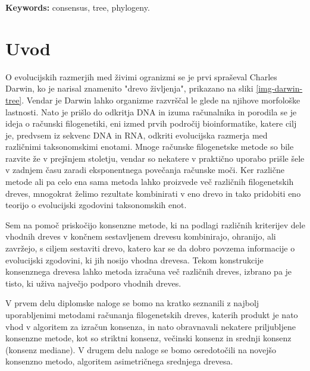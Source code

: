 \documentclass[a4paper, 12pt]{book}
\newcommand{\tkeywordsEn}{consensus, tree, phylogeny}
\newcommand{\clearemptydoublepage}{\newpage{\pagestyle{empty}\cleardoublepage}}
\begin{document}
\noindent\textbf{Keywords:} \tkeywordsEn.
\clearemptydoublepage

\mainmatter
\setcounter{page}{1}
\pagestyle{fancy}

\chapter{Uvod}
O evolucijskih razmerjih med živimi ogranizmi se je prvi spraševal Charles Darwin,
ko je narisal znamenito "drevo življenja", prikazano na sliki \ref{img-darwin-tree}.
Vendar je Darwin lahko organizme razvrščal le glede na njihove morfološke lastnosti.
Nato je prišlo do odkritja DNA in izuma računalnika in porodila se je ideja o računski
filogenetiki, eni izmed prvih področij bioinformatike, katere cilj je, predvsem iz 
sekvenc DNA in RNA, odkriti evolucijska razmerja med različnimi taksonomskimi enotami.
Mnoge računske filogenetske metode so bile razvite že v prejšnjem stoletju, vendar so
nekatere v praktično uporabo prišle šele v zadnjem času zaradi eksponentnega povečanja
računske moči. Ker različne metode ali pa celo ena sama metoda lahko proizvede več 
različnih filogenetskih dreves, mnogokrat želimo rezultate kombinirati v eno drevo in 
tako pridobiti eno teorijo o evolucijski zgodovini taksonomskih enot. 

Sem na pomoč priskočijo konsenzne metode, ki na podlagi različnih  kriterijev dele 
vhodnih dreves v končnem sestavljenem drevesu kombinirajo, ohranijo, ali zavržejo, 
s ciljem sestaviti drevo, katero kar se da dobro povzema informacije o evolucijski 
zgodovini, ki jih nosijo vhodna drevesa. Tekom konstrukcije konsenznega drevesa lahko 
metoda izračuna več različnih dreves, izbrano pa je tisto, ki uživa največjo podporo 
vhodnih dreves.

V prvem delu diplomske naloge se bomo na kratko seznanili z najbolj uporabljenimi
metodami računanja filogenetskih dreves, katerih produkt je nato vhod v algoritem 
za izračun konsenza, in nato obravnavali nekatere priljubljene konsenzne metode, 
kot so striktni konsenz, večinski konsenz in srednji konsenz (konsenz mediane). 
V drugem delu naloge se bomo osredotočili na novejšo konsenzno metodo, algoritem
asimetričnega srednjega drevesa. 
\end{document}
